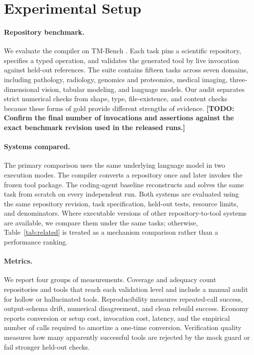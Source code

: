 \documentclass[letterpaper]{article} %
\newcommand{\drafttodo}[1]{\textbf{[TODO: #1]}}
\begin{document}
\section{Experimental Setup}
\label{sec:setup}

\paragraph{Repository benchmark.}
We evaluate the compiler on TM-Bench \citep{wolflein2025toolmaker}. Each task pins a scientific repository, specifies a typed operation, and validates the generated tool by live invocation against held-out references. The suite contains fifteen tasks across seven domains, including pathology, radiology, genomics and proteomics, medical imaging, three-dimensional vision, tabular modeling, and language models. Our audit separates strict numerical checks from shape, type, file-existence, and content checks because these forms of gold provide different strengths of evidence. \drafttodo{Confirm the final number of invocations and assertions against the exact benchmark revision used in the released runs.}

\paragraph{Systems compared.}
The primary comparison uses the same underlying language model in two execution modes. The compiler converts a repository once and later invokes the frozen tool package. The coding-agent baseline reconstructs and solves the same task from scratch on every independent run. Both systems are evaluated using the same repository revision, task specification, held-out tests, resource limits, and denominators. Where executable versions of other repository-to-tool systems are available, we compare them under the same tasks; otherwise, Table~\ref{tab:related} is treated as a mechanism comparison rather than a performance ranking.

\paragraph{Metrics.}
We report four groups of measurements. Coverage and adequacy count repositories and tools that reach each validation level and include a manual audit for hollow or hallucinated tools. Reproducibility measures repeated-call success, output-schema drift, numerical disagreement, and clean rebuild success. Economy reports conversion or setup cost, invocation cost, latency, and the empirical number of calls required to amortize a one-time conversion. Verification quality measures how many apparently successful tools are rejected by the mock guard or fail stronger held-out checks.
\end{document}
